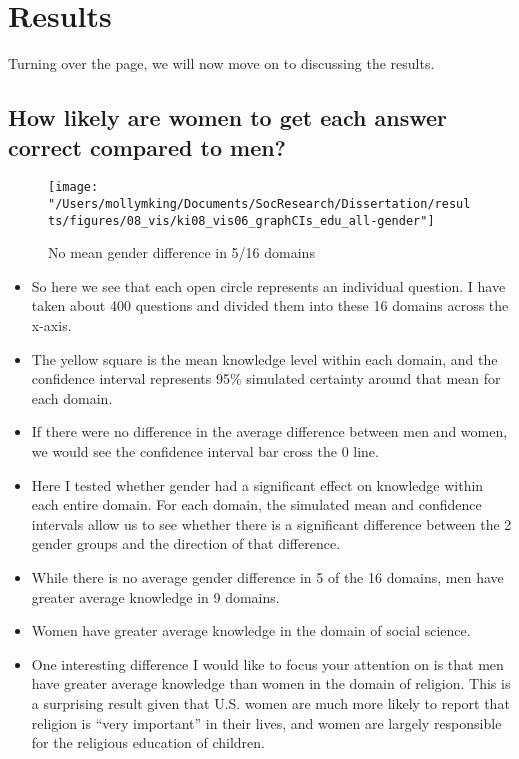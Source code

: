 \documentclass[]{article}
\begin{document}

\newpage
\section{Results}\label{Results}

Turning over the page, we will now move on to discussing the results.

\subsection{How likely are women to get each answer correct compared to men?}
\begin{figure}[ht]
    \begin{center}
      \texttt{[image: "/Users/mollymking/Documents/SocResearch/Dissertation/results/figures/08\_vis/ki08\_vis06\_graphCIs\_edu\_all-gender"]}
      \caption{No mean gender difference in 5/16 domains}
    \end{center}
\end{figure}

\begin{itemize}
  \item{So here we see that each open circle represents an individual question. I have taken about 400 questions and divided them into these 16 domains across the x-axis.}
  \item{The yellow square is the mean knowledge level within each domain, and the confidence interval represents 95\% simulated certainty around that mean for each domain.}
  \item{If there were no difference in the average difference between men and women, we would see the confidence interval bar cross the 0 line.}
  \item{Here I tested whether gender had a significant effect on knowledge within each entire domain. For each domain, the simulated mean and confidence intervals allow us to see whether there is a significant difference between the 2 gender groups and the direction of that difference.}
  \item{While there is no average gender difference in 5 of the 16 domains, men have greater average knowledge in 9 domains.}
  \item{Women have greater average knowledge in the domain of social science.}
  \item{One interesting difference I would like to focus your attention on is that men have greater average knowledge than women in the domain of religion. This is a surprising result given that U.S. women are much more likely to report that religion is ``very important'' in their lives, and women are largely responsible for the religious education of children.}
\end{itemize}
\end{document}
